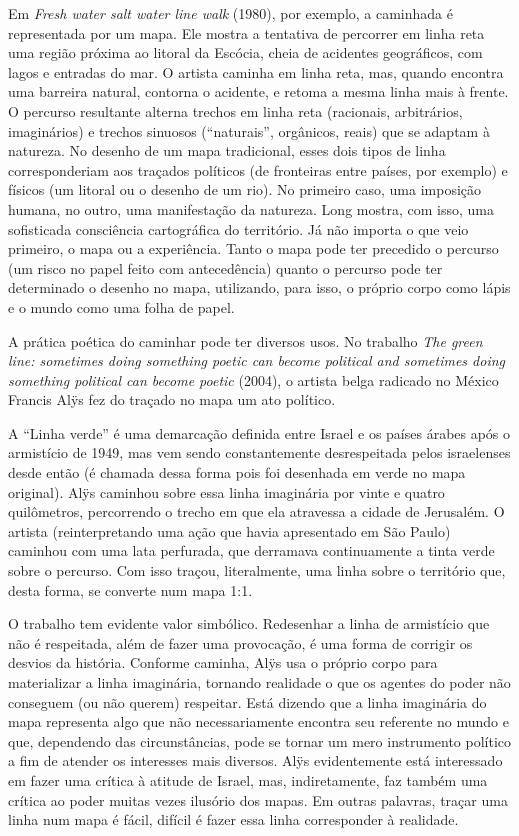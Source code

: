Em \emph{Fresh water salt water line walk} (1980), por exemplo, a
caminhada é representada por um mapa. Ele mostra a tentativa de
percorrer em linha reta uma região próxima ao litoral da Escócia, cheia
de acidentes geográficos, com lagos e entradas do mar. O artista caminha
em linha reta, mas, quando encontra uma barreira natural, contorna o
acidente, e retoma a mesma linha mais à frente. O percurso resultante
alterna trechos em linha reta (racionais, arbitrários, imaginários) e
trechos sinuosos (``naturais'', orgânicos, reais) que se adaptam à
natureza. No desenho de um mapa tradicional, esses dois tipos de linha
corresponderiam aos traçados políticos (de fronteiras entre países, por
exemplo) e físicos (um litoral ou o desenho de um rio). No primeiro caso, uma imposição humana,
no outro, uma manifestação da natureza. Long mostra, com isso, uma
sofisticada consciência cartográfica do território. Já não importa o que
veio primeiro, o mapa ou a experiência. Tanto o mapa pode ter precedido
o percurso (um risco no papel feito com antecedência) quanto o percurso
pode ter determinado o desenho no mapa, utilizando, para isso, o próprio
corpo como lápis e o mundo como uma folha de papel.

A prática poética do caminhar pode ter diversos usos. No trabalho
\emph{The green line: sometimes doing something poetic can become
political and sometimes doing something political can become poetic}
(2004), o artista belga radicado no México Francis Alÿs fez do traçado
no mapa um ato político.

A ``Linha verde'' é uma demarcação definida entre Israel e os países
árabes após o armistício de 1949, mas vem sendo constantemente
desrespeitada pelos israelenses desde então (é chamada dessa forma pois
foi desenhada em verde no mapa original). Alÿs caminhou sobre essa linha
imaginária por vinte e quatro quilômetros, percorrendo o trecho em que
ela atravessa a cidade de Jerusalém. O artista (reinterpretando uma ação
que havia apresentado em São Paulo) caminhou com uma lata perfurada, que
derramava continuamente a tinta verde sobre o percurso. Com isso traçou,
literalmente, uma linha sobre o território que, desta forma, se converte
num mapa 1:1.

O trabalho tem evidente valor simbólico. Redesenhar a linha de
armistício que não é respeitada, além de fazer uma provocação, é uma
forma de corrigir os desvios da história. Conforme caminha, Alÿs usa o
próprio corpo para materializar a linha imaginária, tornando realidade o
que os agentes do poder não conseguem (ou não querem) respeitar. Está
dizendo que a linha imaginária do mapa representa algo que não
necessariamente encontra seu referente no mundo e que, dependendo das
circunstâncias, pode se tornar um mero instrumento político a fim de
atender os interesses mais diversos. Alÿs evidentemente está interessado
em fazer uma crítica à atitude de Israel, mas, indiretamente, faz também
uma crítica ao poder muitas vezes ilusório dos mapas. Em outras
palavras, traçar uma linha num mapa é fácil, difícil é fazer essa linha
corresponder à realidade.

